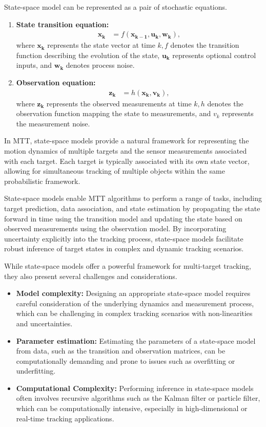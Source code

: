 State-space model can be represented as a pair of stochastic equations.
\begin{enumerate}
    \item \textbf{State transition equation:}
        \begin{align}
                  \mathbf{x_k} &= f(\mathbf{x_{k-1}}, \mathbf{u_k}, \mathbf{w_k}), \label{eq:state_space_model_state}
        \end{align}
        where $\mathbf{x_k}$ represents the state vector at time $k, f$ denotes the transition function describing the
        evolution of the state, $\mathbf{u_k}$ represents optional control inputs, and $\mathbf{w_k}$ denotes process
    noise.
    \item \textbf{Observation equation:}
        \begin{align}
            \mathbf{z_k} &= h(\mathbf{x_{k}}, \mathbf{v_k}), \label{eq:state_space_model_observation}
        \end{align}
        where $\mathbf{z_k}$ represents the observed measurements at time $k, h$ denotes the observation function
    mapping the
    state to measurements, and $v_k$ represents the measurement noise.
\end{enumerate}

In MTT, state-space models provide a natural framework for representing the motion dynamics of multiple targets and the sensor measurements associated with each target. Each target is typically associated with its own state vector, allowing for simultaneous tracking of multiple objects within the same probabilistic framework.

State-space models enable MTT algorithms to perform a range of tasks, including target prediction, data association, and state estimation by propagating the state forward in time using the transition model and updating the state based on observed measurements using the observation model. By incorporating uncertainty explicitly into the tracking process, state-space models facilitate robust inference of target states in complex and dynamic tracking scenarios.

While state-space models offer a powerful framework for multi-target tracking, they also present several challenges and considerations.
\begin{itemize}
    \item \textbf{Model complexity:} Designing an appropriate state-space model requires careful consideration of the
    underlying dynamics and measurement process, which can be challenging in complex tracking scenarios with non-linearities and uncertainties.
    \item \textbf{Parameter estimation:} Estimating the parameters of a state-space model from data, such as the transition and observation matrices, can be computationally demanding and prone to issues such as overfitting or underfitting.
    \item \textbf{Computational Complexity:} Performing inference in state-space models often involves recursive algorithms such as the Kalman filter or particle filter, which can be computationally intensive, especially in high-dimensional or real-time tracking applications.
\end{itemize}


